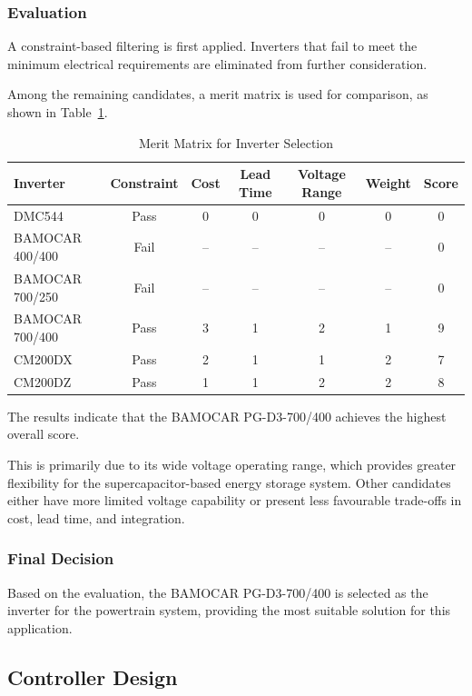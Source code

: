 \documentclass[a4paper,12pt]{article}
\begin{document}
\subsubsection{Evaluation}

A constraint-based filtering is first applied. Inverters that fail to meet the minimum electrical requirements are eliminated from further consideration.

Among the remaining candidates, a merit matrix is used for comparison, as shown in Table~\ref{tab:inverter_selection}.

\begin{table}[H]
\centering
\caption{Merit Matrix for Inverter Selection}
\label{tab:inverter_selection}
\begin{tabular}{lcccccc}
\toprule
Inverter & Constraint & Cost & Lead Time & Voltage Range & Weight & Score \\
\midrule
DMC544 & Pass & 0 & 0 & 0 & 0 & 0 \\
BAMOCAR 400/400 & Fail & -- & -- & -- & -- & 0 \\
BAMOCAR 700/250 & Fail & -- & -- & -- & -- & 0 \\
BAMOCAR 700/400 & Pass & 3 & 1 & 2 & 1 & 9 \\
CM200DX & Pass & 2 & 1 & 1 & 2 & 7 \\
CM200DZ & Pass & 1 & 1 & 2 & 2 & 8 \\
\bottomrule
\end{tabular}
\end{table}

The results indicate that the BAMOCAR PG-D3-700/400 achieves the highest overall score.

This is primarily due to its wide voltage operating range, which provides greater flexibility for the supercapacitor-based energy storage system. Other candidates either have more limited voltage capability or present less favourable trade-offs in cost, lead time, and integration.

\subsubsection{Final Decision}

Based on the evaluation, the BAMOCAR PG-D3-700/400 is selected as the inverter for the powertrain system, providing the most suitable solution for this application.

\subsection{Controller Design}
\end{document}
